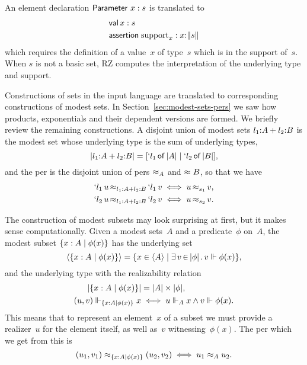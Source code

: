 An element declaration $\iParameter{x}{s}$ is translated to
%
\begin{align*}
  & \ovalspec{x}{s} \\
  & \oassertion{\mathrm{support}_x}{\ototal{x}{s}}
\end{align*}
%
which requires the definition of a value~$x$ of type~$s$ which is in
the support of~$s$. When $s$ is not a basic set, RZ computes the
interpretation of the underlying type and support.

Constructions of sets in the input language are translated to
corresponding constructions of modest sets. In
Section~\ref{sec:modest-sets-pers} we saw how products, exponentials
and their dependent versions are formed. We briefly review the
remaining constructions. A disjoint union of modest sets
$\isum{\il_1}{A}{\il_2}{B}$ is the modest set whose underlying type is
the sum of underlying types,
%
\begin{equation*}
  \typeOf{\isum{\il_1}{A}{\il_2}{B}} =
  \osumtyx{\il_1}{\typeOf{A}}{\il_2}{\typeOf{B}},
\end{equation*}
%
and the per is the disjoint union of pers $\per_{A}$ and $\per{B}$, so
that we have
%
\begin{align*}
  \oper{\isum{\il_1}{A}{\il_2}{B}}{\oinj{\il_1}{u}}{\oinj{\il_1}{v}}
  &\iff \oper{s_1}{u}{v},
  \\
  \oper{\isum{\il_1}{A}{\il_2}{B}}{\oinj{\il_2}{u}}{\oinj{\il_2}{v}}
  &\iff \oper{s_2}{u}{v}.
\end{align*}
%

The construction of modest subsets may look surprising at first, but
it makes sense computationally. Given a modest sets~$A$ and a
predicate~$\phi$ on~$A$, the modest subset $\set{x : A \such \phi(x)}$
has the underlying set
%
\begin{equation*}
  \setOf{\set{x : A \such \phi(x)}} =
  \set{x \in \setOf{A} \such \xsome{v}{\typeOf{\phi}}{v \rz \phi(x)}},
\end{equation*}
%
and the underlying type with the realizability relation
%
\begin{align*}
  \typeOf{\set{x : A \such \phi(x)}} &= \typeOf{A} \times
  \typeOf{\phi},\\
  (u,v) \rz_{\set{x : A \such \phi(x)}} x &\iff
  u \rz_A x \land v \rz \phi(x).
\end{align*}
%
This means that to represent an element~$x$ of a subset we must
provide a realizer~$u$ for the element itself, as well as~$v$
witnessing~$\phi(x)$. The per which we get from this is
%
\begin{equation*}
    (u_1, v_1) \per_{\set{x : A \such \phi(x)}} (u_2, v_2) \iff
    u_1 \per_A u_2.
\end{equation*}

